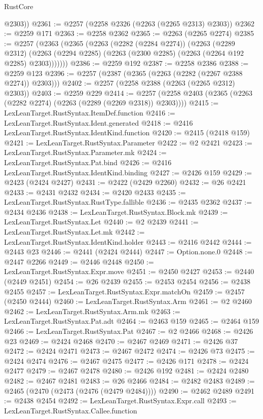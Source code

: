 \begin{lexlean}{RustCore}
\begin{coremodule}
        @2303))
@2361 := @2257 (@2258 @2326 (@2263 (@2265 @2313) @2303))
@2362 := @2259 @171
@2363 := @2258 @2362
@2365 := @2263 (@2265 @2274)
@2385 := @2257
    (@2363
      (@2365
        (@2263
          (@2282 (@2284 @2274))
          (@2263
            (@2289 @2312)
            (@2263 (@2294 @2285) (@2263 (@2300 @2285) (@2263 (@2264 @192 @2285) @2303)))))))
@2386 := @2259 @192
@2387 := @2258 @2386
@2388 := @2259 @123
@2396 := @2257 (@2387 (@2365 (@2263 (@2282 (@2267 @2388 @2274)) @2303)))
@2402 := @2257 (@2258 @2388 (@2263 (@2265 @2312) @2303))
@2403 := @2259 @229
@2414 := @2257 (@2258 @2403 (@2365 (@2263 (@2282 @2274) (@2263 (@2289 (@2269 @2318)) @2303))))
@2415 := LexLeanTarget.RustSyntax.ItemDef.function
@2416 := LexLeanTarget.RustSyntax.Ident.generated
@2418 := @2416 LexLeanTarget.RustSyntax.IdentKind.function
@2420 := @2415 (@2418 @159)
@2421 := LexLeanTarget.RustSyntax.Parameter
@2422 := @2 @2421
@2423 := LexLeanTarget.RustSyntax.Parameter.mk
@2424 := LexLeanTarget.RustSyntax.Pat.bind
@2426 := @2416 LexLeanTarget.RustSyntax.IdentKind.binding
@2427 := @2426 @159
@2429 := @2423 (@2424 @2427)
@2431 := @2422 (@2429 @2260)
@2432 := @26 @2421
@2433 := @2431 @2432
@2434 := @2420 @2433
@2435 := LexLeanTarget.RustSyntax.RustType.fallible
@2436 := @2435 @2362
@2437 := @2434 @2436
@2438 := LexLeanTarget.RustSyntax.Block.mk
@2439 := LexLeanTarget.RustSyntax.Let
@2440 := @2 @2439
@2441 := LexLeanTarget.RustSyntax.Let.mk
@2442 := LexLeanTarget.RustSyntax.IdentKind.holder
@2443 := @2416 @2442
@2444 := @2443 @23
@2446 := @2441 (@2424 @2444)
@2447 := Option.none.{0}
@2448 := @2447 @2266
@2449 := @2446 @2448
@2450 := LexLeanTarget.RustSyntax.Expr.move
@2451 := @2450 @2427
@2453 := @2440 (@2449 @2451)
@2454 := @26 @2439
@2455 := @2453 @2454
@2456 := @2438 @2455
@2457 := LexLeanTarget.RustSyntax.Expr.matchOn
@2459 := @2457 (@2450 @2444)
@2460 := LexLeanTarget.RustSyntax.Arm
@2461 := @2 @2460
@2462 := LexLeanTarget.RustSyntax.Arm.mk
@2463 := LexLeanTarget.RustSyntax.Pat.adt
@2464 := @2463 @159
@2465 := @2464 @159
@2466 := LexLeanTarget.RustSyntax.Pat
@2467 := @2 @2466
@2468 := @2426 @23
@2469 := @2424 @2468
@2470 := @2467 @2469
@2471 := @2426 @37
@2472 := @2424 @2471
@2473 := @2467 @2472
@2474 := @2426 @73
@2475 := @2424 @2474
@2476 := @2467 @2475
@2477 := @2426 @171
@2478 := @2424 @2477
@2479 := @2467 @2478
@2480 := @2426 @192
@2481 := @2424 @2480
@2482 := @2467 @2481
@2483 := @26 @2466
@2484 := @2482 @2483
@2489 := @2465 (@2470 (@2473 (@2476 (@2479 @2484))))
@2490 := @2462 @2489
@2491 := @2438 @2454
@2492 := LexLeanTarget.RustSyntax.Expr.call
@2493 := LexLeanTarget.RustSyntax.Callee.function

\end{coremodule}
\end{lexlean}
